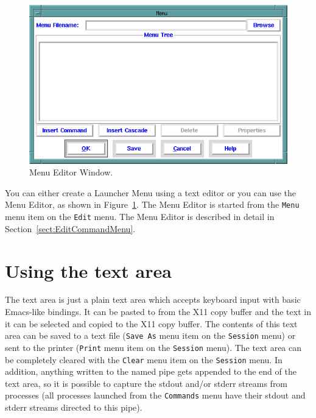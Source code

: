 \begin{figure}[hbpt]
\begin{centering}
\includegraphics[width=5in]{MenuEditor.png}
\caption{Menu Editor Window.}
\label{tut:fig:menueditor}
\end{centering}
\end{figure}
You can either create a Launcher Menu using a text editor or you can use
the Menu Editor, as shown in Figure~\ref{tut:fig:menueditor}.  The Menu
Editor is started from the \texttt{Menu} menu item on the \texttt{Edit}
menu. The Menu Editor is described in detail in
Section~\ref{sect:EditCommandMenu}. 



\section{Using the text area}


The text area is just a plain text area which accepts keyboard input
with basic Emacs-like bindings.  It can be pasted to from the X11 copy
buffer and the text in it can be selected and copied to the X11 copy
buffer.  The contents of this text area can be saved to a text file
(\texttt{Save As} menu item on the \texttt{Session} menu) or sent to
the printer (\texttt{Print} menu item on the \texttt{Session} menu). 
The text area can be completely cleared with the \texttt{Clear} menu
item on the \texttt{Session} menu.  In addition, anything written to the
named pipe gets appended to the end of the text area, so it is possible
to capture the stdout and/or stderr streams from processes (all
processes launched from the \texttt{Commands} menu have their stdout and
stderr streams directed to this pipe).

